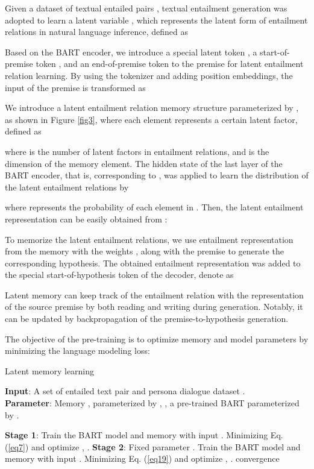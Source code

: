 \documentclass[letterpaper]{article} \usepackage{aaai23}  \usepackage{times}  \usepackage{helvet}  \usepackage{courier}  \usepackage[hyphens]{url}  \usepackage{graphicx} \urlstyle{rm} \def\UrlFont{\rm}  \usepackage{natbib}  \usepackage{caption} \frenchspacing  \setlength{\pdfpagewidth}{8.5in}  \setlength{\pdfpageheight}{11in}  \usepackage{algorithm}
\begin{document}
Given a dataset of textual entailed pairs , textual entailment generation was adopted to learn a latent variable , which represents the latent form of entailment relations in natural language inference, defined as


 Based on the BART encoder, we introduce a special latent token , a start-of-premise token , and an end-of-premise token  to the premise for latent entailment relation learning. By using the tokenizer and adding position embeddings, the input of the premise is transformed as
 

 We introduce a latent entailment relation memory structure  parameterized by , as shown in Figure \ref{fig3}, where each element represents a certain latent factor, defined as
 
where  is the number of latent factors in entailment relations, and  is the dimension of the memory element. The hidden state of the last layer of the BART encoder, that is,  corresponding to , was applied to learn the distribution of the latent entailment relations  by

where  represents the probability of each element in . Then, the latent entailment representation  can be easily obtained from :


To memorize the latent entailment relations, we use entailment representation  from the memory  with the weights , along with the premise to generate the corresponding hypothesis. The obtained entailment representation  was added to the special start-of-hypothesis token  of the decoder, denote as


Latent memory can keep track of the entailment relation with the representation of the source premise by both reading and writing during generation. Notably, it can be updated by backpropagation of the premise-to-hypothesis generation.

The objective of the pre-training is to optimize memory  and model parameters  by minimizing the language modeling loss:


\begin{algorithm}[tb]
\caption{Latent memory learning}
\label{alg:algorithm1}
\textbf{Input}: A set of entailed text pair  and persona dialogue dataset .\\
\textbf{Parameter}: Memory ,  parameterized by , , a pre-trained BART parameterized by .
\begin{algorithmic}[1] \REPEAT
\STATE \textbf{Stage 1}:
\STATE Train the BART model and memory  with input  .
\STATE Minimizing Eq. (\ref{eq7}) and optimize , .
\STATE \textbf{Stage 2}:
\STATE Fixed parameter .
\STATE Train the BART model and memory  with input .
\STATE Minimizing Eq. (\ref{eq19}) and optimize  , .
\UNTIL convergence
\end{algorithmic}
\end{algorithm}
\end{document}
